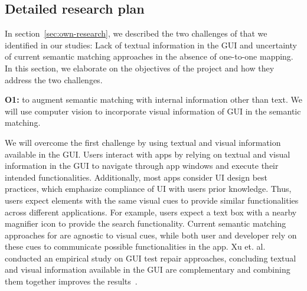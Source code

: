 \subsection{Detailed research plan}
\label{sec:detailed-plan}

In section~\ref{sec:own-research}, we described the two challenges of \testreuse that we identified in our studies:
Lack of textual information in the GUI and uncertainty of current semantic matching approaches in the absence of one-to-one mapping. 
In this section, we elaborate on the objectives of the \project project and how they address the two challenges.

\bigskip 
\noindent
\textbf{O1:} to augment semantic matching with internal information other than text.  
We will use computer vision to incorporate visual information of GUI in the semantic matching.  

\smallskip
We will overcome the first challenge by using  textual and visual information available in the GUI.
Users interact with apps by relying on  textual and visual information in the GUI to navigate through app windows and execute their intended functionalities. 
Additionally, most apps consider UI design best practices, which emphasize compliance of UI with users prior knowledge.  
 Thus, users expect elements with the same visual cues to provide similar functionalities across different applications.
For example, users expect a text box with a nearby magnifier icon to provide  the search functionality.
Current semantic matching approaches for \testreuse are agnostic to visual cues, while both user and developer rely on these cues to communicate possible functionalities in the app. 
Xu et. al. conducted an empirical study on GUI test repair approaches, concluding textual and visual information available in the GUI are complementary and combining them together improves the results~\cite{Xu:GUIDER:ISSTA:2021}.




